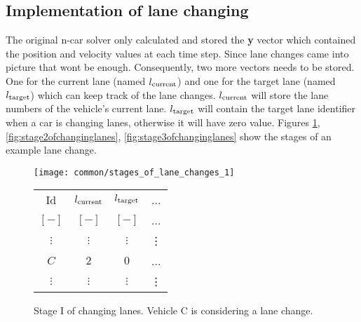 		\subsection*{Implementation of lane changing}
		The original n-car solver only calculated and stored the \textbf{y} vector which contained the position and velocity values at each time step. Since lane changes came into picture that wont be enough. Consequently, two more vectors needs to be stored. One for the current lane (named $l_{\rm current}$) and one for the target lane (named $l_{\rm target}$) which can keep track of the lane changes. $l_{\rm current}$ will store the lane numbers of the vehicle's current lane. $l_{\rm target}$ will contain the target lane identifier when a car is changing lanes, otherwise it will have zero value. Figures \ref{fig:stage1ofchanginglanes}, \ref{fig:stage2ofchanginglanes}, \ref{fig:stage3ofchanginglanes} show the stages of an example lane change.
		\begin{figure}
			\begin{center}
				\begin{minipage}{.65\textwidth}
					\texttt{[image: common/stages\_of\_lane\_changes\_1]}
				\end{minipage}\quad
				\begin{minipage}{.3\textwidth}
					\begin{tabular}{ |c|c|c|c| }
						\hline
						Id &  $l_{\rm current}$ & $l_{\rm target}$ & ... \\
						$[-]$ & $[-]$ & $[-]$ & ...\\
						\hline
						$\vdots$ & $\vdots$ & $\vdots$ & \vdots\\
						$C$ & $2$ & $0$ & ...\\
						$\vdots$ & $\vdots$ & $\vdots$ & \vdots\\
						\hline
					\end{tabular}
				\end{minipage}
			\end{center}
			\caption{Stage I of changing lanes. Vehicle C is considering a lane change.}
			\label{fig:stage1ofchanginglanes}
		\end{figure}
